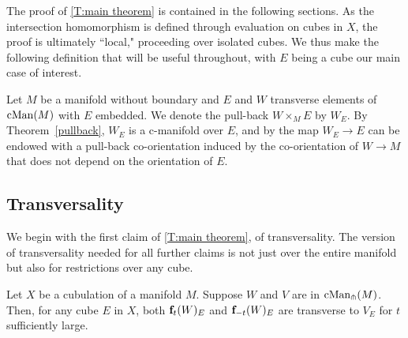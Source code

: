 \bigskip

The proof of \cref{T:main theorem} is contained in the following sections.
As the intersection homomorphism is defined through evaluation on cubes in $X$, the proof
is ultimately ``local," proceeding over isolated cubes.
We thus make the following definition that will be useful throughout, with $E$ being a cube our main case of interest.

\begin{definition}
	Let $M$ be a manifold without boundary and $E$ and $W$ transverse elements of $\mathrm{cMan}(M)$ with $E$ embedded.
	We denote the pull-back $W \times_M E$ by $W_E$.
	By Theorem~\ref{pullback}, $W_E$ is a c-manifold over $E$, and by \cite{medina2022foundations} the map $W_E\to E$ can be endowed with a pull-back co-orientation induced by the co-orientation of $W\to M$ that does not depend on the orientation of $E$.
\end{definition}

\subsection{Transversality}

We begin with the first claim of \cref{T:main theorem}, of transversality.
The version of transversality needed for all further claims
is not just over the entire manifold but also for restrictions over any cube.

\begin{theorem}\label{T: transversality}
	Let $X$ be a cubulation of a manifold $M$.
	Suppose $W$ and $V$ are in $\mathrm{cMan}_\pitchfork(M)$.
	Then, for any cube $E$ in $X$, both $\mathbf{f}_t(W)_E$ and $\mathbf{f}_{-t}(W)_E$ are transverse to $V_E$ for $t$ sufficiently large.
\end{theorem}

